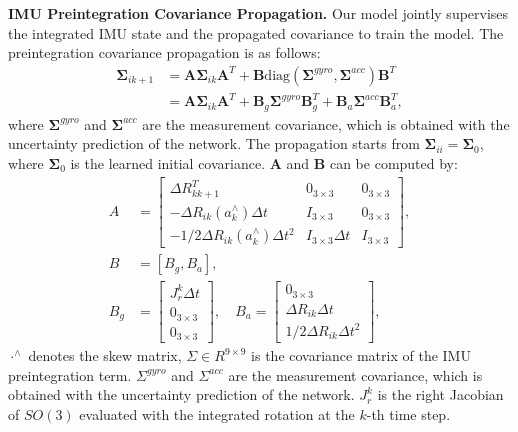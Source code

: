 \noindent \textbf{IMU Preintegration Covariance Propagation.} Our model jointly supervises the integrated IMU state and the propagated covariance to train the model. The preintegration covariance propagation is as follows:
\begin{equation}
\label{eq:maci2:cov_prop_appendix}
\begin{aligned}
\bm{\Sigma}_{ik+1} &= \mathbf{A}\bm{\Sigma}_{ik}\mathbf{A}^T + \mathbf{B}\text{diag}(\bm{\Sigma}^{gyro}, \bm{\Sigma}^{acc})\mathbf{B}^T \\
&= \mathbf{A}\bm{\Sigma}_{ik}\mathbf{A}^T + \mathbf{B}_g\bm{\Sigma}^{gyro}\mathbf{B}_g^T + \mathbf{B}_a\bm{\Sigma}^{acc}\mathbf{B}_a^T,
\end{aligned}
\end{equation}
where $\bm{\Sigma}^{gyro}$ and $\bm{\Sigma}^{acc}$ are the measurement covariance, which is obtained with the uncertainty prediction of the network. The propagation starts from $\bm{\Sigma}_{ii} = \bm{\Sigma}_{0}$, where $\bm{\Sigma}_{0}$ is the learned initial covariance. $\mathbf{A}$ and $\mathbf{B}$ can be computed by:
\begin{equation}
\begin{aligned}
A &= \begin{bmatrix}
\Delta R_{kk+1}^T & 0_{3 \times 3} & 0_{3 \times 3} \\
-\Delta R_{ik}(a_k^{\wedge})\Delta t & I_{3 \times 3} & 0_{3 \times 3} \\
-1/2\Delta R_{ik}(a_k^{\wedge})\Delta t^2 & I_{3 \times 3}\Delta t & I_{3 \times 3}
\end{bmatrix},\\
B &= [B_g, B_a], \\
B_g &= \begin{bmatrix}
J_r^k\Delta t \\
0_{3 \times 3} \\
0_{3 \times 3}
\end{bmatrix}, \quad B_a = \begin{bmatrix}
0_{3 \times 3} \\
\Delta R_{ik}\Delta t \\
1/2\Delta R_{ik}\Delta t^2
\end{bmatrix},
\end{aligned}
\end{equation}
$\cdot^{\wedge}$ denotes the skew matrix, $\Sigma \in R^{9\times 9}$ is the covariance matrix of the IMU preintegration term. $\Sigma^{gyro}$ and $\Sigma^{acc}$ are the measurement covariance, which is obtained with the uncertainty prediction of the network. $J_r^k$ is the right Jacobian of $SO(3)$ evaluated with the integrated rotation at the $k$-th time step.


